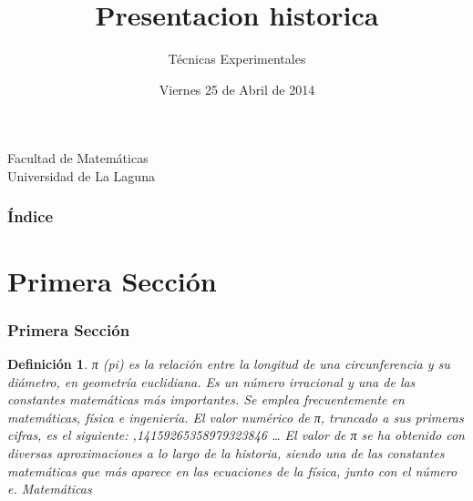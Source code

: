 \documentclass{beamer}
\title[E numero PI]{Presentacion historica}
\author[Shaila Verona Rodriguez]{Técnicas Experimentales}
\date[25-04-2014]{Viernes 25 de Abril de 2014}
\newtheorem{definicion}{Definición}
\begin{document}
  
\begin{frame}

  \hspace*{7.0cm}
  \titlepage

  \begin{small}
    \begin{center}
     Facultad de Matemáticas \\
     Universidad de La Laguna
    \end{center}
  \end{small}

\end{frame}

\begin{frame}
  \frametitle{Índice}  
  \tableofcontents[pausesections]
\end{frame}


\section{Primera Sección}


\begin{frame}

\frametitle{Primera Sección}

\begin{definicion}
π (pi) es la relación entre la longitud de una circunferencia y su diámetro, en geometría euclidiana. Es un número irracional y una de las constantes matemáticas más importantes. Se emplea frecuentemente en matemáticas, física e ingeniería. El valor numérico de π, truncado a sus primeras cifras, es el siguiente:
     \pi {},14159265358979323846 \; \dots 
El valor de π se ha obtenido con diversas aproximaciones a lo largo de la historia, siendo una de las constantes matemáticas que más aparece en las ecuaciones de la física, junto con el número e. 
\alert{Matemáticas}~\cite{plan}
\end{definicion}

\end{frame}
\end{document}

